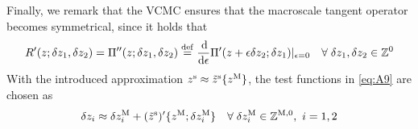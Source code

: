 \documentclass[12pt,a4paper]{article}
\renewcommand{\ta}[1]{\mathbfit{#1}}
\renewcommand{\ts}[1]{\mathbfit{#1}}
\renewcommand{\Box}{\mdlgwhtsquare}
\DeclarePairedDelimiter{\jmp}{[\![}{]\!]}
\newcommand{\rve}{
  {\mathchoice
   {\mbox{\scalebox{0.67}{$\Box$}}}
   {\mbox{\scalebox{0.67}{$\Box$}}}
   {\mbox{\scalebox{0.5}{$\Box$}}}
   {\mbox{\scalebox{0.375}{$\Box$}}}
  }
}
\begin{document}
Finally, we remark that the VCMC ensures that the macroscale tangent operator becomes symmetrical, since it holds that
\begin{align}
\label{eq:A9} R'(z;\delta z_1,\delta z_2) = \Pi''(z;\delta z_1,\delta z_2) \overset{\mathrm{def}}{=} \frac{\operatorname{d \!}}{\operatorname{d \!}\epsilon}\Pi'(z+\epsilon\delta z_2;\delta z_1)|_{\epsilon=0}\quad \forall\;\delta z_1,\delta z_2 \in \mathbb{Z}^0
\end{align}
With the introduced approximation $z^{\mathrm{s}} \approx \tilde{z}^{\mathrm{s}}\{z^{\mathrm{M}}\}$, the test functions in \eqref{eq:A9} are chosen as
\begin{align}
\label{eq:A10} \delta z_i \approx \delta z_i^{\mathrm{M}} + (\tilde{z}^{\mathrm{s}})'\{z^{\mathrm{M}};\delta z_i^{\mathrm{M}}\} \quad \forall\;\delta z_i^{\mathrm{M}}\in\mathbb{Z}^{\mathrm{M},0}, \,\, i=1,2
\end{align}


\end{document}

